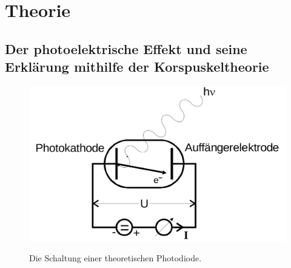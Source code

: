 
\section{Theorie}
\label{sec:Theorie}


 \subsection{Der photoelektrische Effekt und seine Erklärung mithilfe der Korspuskeltheorie  }


 \begin{figure}
 	\centering
 	\caption{Die Schaltung einer theoretischen Photodiode.}
 	\includegraphics[width=\linewidth-170pt,height=\textheight-170pt,keepaspectratio]{content/Bilder/photodiode.png}
 	\label{fig:photodiode}
 \end{figure}


